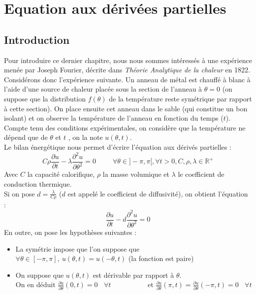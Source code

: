 \documentclass[a4paper,10pt]{report}
\begin{document}
\chapter{Equation aux dérivées partielles}
\section{Introduction}
Pour introduire ce dernier chapitre, nous nous sommes intéressés à une expérience menée par Joseph Fourier, décrite dans \textit{Théorie Analytique de la chaleur} en 1822. \\
\indent Considérons donc l'expérience suivante. Un anneau de métal est chauffé à blanc à l'aide d'une source de chaleur placée sous la section de l'anneau à $\theta=0$ (on suppose que la distribution $f(\theta)$ de la température reste symétrique par rapport à cette section). On place ensuite cet anneau dans le sable (qui constitue un bon isolant) et on observe la température de l'anneau en fonction du temps ($t$). Compte tenu des conditions expérimentales, on considère que la température ne dépend que de $\theta$ et $t$ , on la note $u(\theta,t)$. \\
\indent Le bilan énergétique nous permet d'écrire l'équation aux dérivés partielles :
\abovedisplayskip=0mm
\begin{displaymath}
\textit{C}\rho \frac{\partial u}{\partial t} - \lambda \frac{\partial^2u}{\partial\theta^2} = 0 \ \ \ \ \ \ \ \ \ \ \ \forall \theta \in ]-\pi , \pi [, \forall t>0, C, \rho, \lambda \in \mathbb{R}^+
\end{displaymath}
Avec $\textit{C}$ la capacité calorifique, $\rho$ la masse volumique et $\lambda$ le coefficient de conduction thermique.\\
Si on pose $d=\frac{\lambda}{\textit{C}\rho}$ ($d$ est appelé le coefficient de diffusivité), on obtient l'équation :
\begin{equation}
\label{eq_chaleur}
\frac{\partial u}{\partial t} - d \frac{\partial^2 u}{\partial \theta^2} = 0
\end{equation}
En outre, on pose les hypothèses suivantes :
\begin{itemize}
\item La symétrie impose que l'on suppose que $\forall \theta \in [-\pi,\pi], \ u(\theta,t)=u(-\theta,t)$ (la fonction est paire)
\item On suppose que $u(\theta,t)$ est dérivable par rapport à $\theta$. \\
On en déduit $\frac{\partial u}{\partial \theta}(0,t)=0 \ \ \ \ \forall t$
\ \ \ \ \ \ \ \ \ \ et $\frac{\partial u}{\partial \theta}(\pi,t)=\frac{\partial u}{\partial \theta}(-\pi,t)=0 \ \ \ \ \forall t$
\end{itemize}
\end{document}
